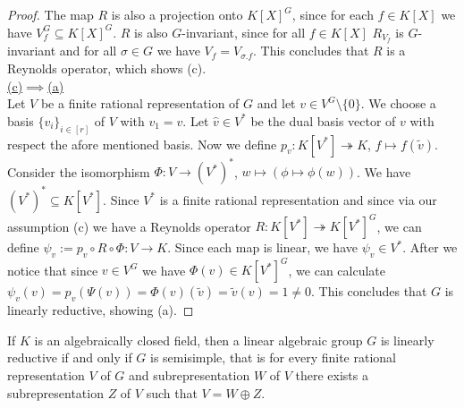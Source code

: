\begin{proof}
  The map $R$ is also a projection onto $K[X]^G$, since for each $f \in K[X]$ we have $V_f^G \subseteq K[X]^G$.
  $R$ is also $G$-invariant, since for all $f \in K[X]$ $R_{V_f}$ is $G$-invariant and for all $\sigma \in G$ we have $V_f = V_{\sigma.f}$.
  This concludes that $R$ is a Reynolds operator, which shows (c).  \\
  \underline{(c)$\implies$(a)}  \\
  Let $V$ be a finite rational representation of $G$ and let $v \in V^G \setminus \{0\}$.
  We choose a basis $\{v_i\}_{i\in [r]}$ of $V$ with $v_1 = v$.
  Let $\hat{v} \in V^\ast$ be the dual basis vector of $v$ with respect the afore mentioned basis.
  Now we define $p_v \colon K[V^\ast] \twoheadrightarrow K$, $f \mapsto f(\tilde{v})$.
  Consider the isomorphism $\Phi \colon V \longrightarrow (V^\ast)^\ast$, $w \mapsto (\phi \mapsto \phi (w))$.
  We have $(V^\ast)^\ast \subseteq K[V^\ast]$.
  Since $V^\ast$ is a finite rational representation and since via our assumption (c) we have a Reynolds operator $R \colon K[V^\ast] \twoheadrightarrow K[V^\ast]^G$, we can define $ \psi_v := p_v \circ R \circ \Phi \colon V \longrightarrow K$.
  Since each map is linear, we have $\psi_v \in V^\ast$.
  After we notice that since $v \in V^G$ we have $\Phi (v) \in K[V^\ast]^G$, we can calculate $\psi_v (v) = p_v (\Psi(v)) = \Phi (v) (\tilde{v}) = \tilde{v} (v) = 1 \neq 0$.
  This concludes that $G$ is linearly reductive, showing (a).
\end{proof}

\begin{theorem}\label{decomp}
  If $K$ is an algebraically closed field, then a linear algebraic group $G$ is linearly reductive if and only if $G$ is semisimple, that is for every finite rational representation $V$ of $G$ and subrepresentation $W$ of $V$ there exists a subrepresentation $Z$ of $V$ such that $V = W \oplus Z$.
\end{theorem}

